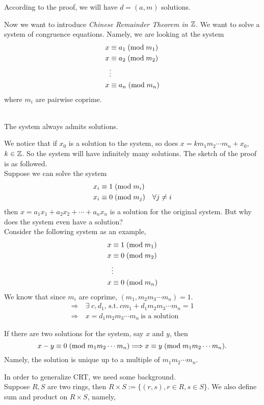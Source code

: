 \documentclass{mynotes}
\begin{document}
\begin{remark}
According to the proof, we will have $d=(a,m)$ solutions.
\end{remark}
Now we want to introduce \emph{Chinese Remainder Theorem in $\mathbb{Z}$}. We want to solve a system of congruence equations. Namely, we are looking at the system
\begin{align*}
x&\equiv a_1\;(\mbox{mod}{\;m_1})\\
x&\equiv a_2\;(\mbox{mod}{\;m_2})\\
&\vdots\\
x&\equiv a_n\;(\mbox{mod}{\;m_n})
\end{align*}
where $m_i$ are pairwise coprime.
\begin{theorem}\mbox{}\\
The system always admits solutions.
\end{theorem}
 We notice that if $x_0$ is a solution to the system, so does $x=km_1m_2\cdots m_n+x_0$, $k\in\mathbb{Z}$. So the system will have infinitely many solutions. The sketch of the proof is as followed.\\ Suppose we can solve the system
\begin{align*}
x_i&\equiv 1\;(\mbox{mod}{\;m_i})\\
x_i&\equiv 0\;(\mbox{mod}{\;m_j})\quad\forall j\ne i
\end{align*}
then $x=a_1x_1+a_2x_2+\cdots+a_nx_n$ is a solution for the original system. But why does the system even have a solution?\\
Consider the following system as an example,
\begin{align*}
x&\equiv 1\;(\mbox{mod}{\;m_1})\\
x&\equiv 0\;(\mbox{mod}{\;m_2})\\
&\vdots\\
x&\equiv 0\;(\mbox{mod}{\;m_n})
\end{align*}
We know that since $m_i$ are coprime, $(m_1,m_2m_3\cdots m_n) = 1$.
\begin{align*}
\Rightarrow &\ \exists\;c,d_1,\,\mbox{s.t.}\  cm_1+d_1m_2m_3\cdots m_n = 1\\
\Rightarrow &\ x=d_1m_2m_3\cdots m_n\ \mbox{is a solution}
\end{align*}
\begin{remark}
If there are two solutions for the system, say $x$ and $y$, then $$x-y\equiv 0\;(\mbox{mod}{\;m_1m_2\cdots m_n})\Longrightarrow x\equiv y\;(\mbox{mod}{\;m_1m_2\cdots m_n}).$$ Namely, the solution is unique up to a multiple of $m_1m_2\cdots m_n$. 
\end{remark}
In order to generalize CRT, we need some background.\\
Suppose $R, S$ are two rings, then $R\times S := \{(r,s), r\in R, s\in S\}$. We also define sum and product on $R\times S$, namely,
\end{document}
